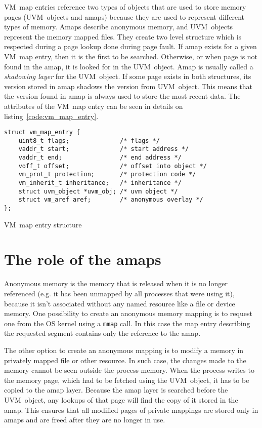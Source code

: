 VM~map entries reference two types of objects that are used to store memory pages (UVM~objects and amaps)
because they are used to represent different types of memory.
Amaps describe anonymous memory, and UVM~objects represent the memory mapped files.
They create two level structure which is respected during a page lookup done during page fault.
If amap exists for a given VM~map entry, then it is the first to be searched.
Otherwise, or when page is not found in the amap, it is looked for in the UVM~object.
Amap is usually called a {\it shadowing layer} for the UVM~object.
If some page exists in both structures, its version stored in amap shadows the version from UVM~object.
This means that the version found in amap is always used to store the most recent data.
The attributes of the VM~map entry can be seen in details on listing~\ref{code:vm_map_entry}.

\begin{listing}
  \begin{verbatim}
struct vm_map_entry {
    uint8_t flags;              /* flags */
    vaddr_t start;              /* start address */
    vaddr_t end;                /* end address */
    voff_t offset;              /* offset into object */
    vm_prot_t protection;       /* protection code */
    vm_inherit_t inheritance;   /* inheritance */
    struct uvm_object *uvm_obj; /* uvm object */
    struct vm_aref aref;        /* anonymous overlay */
};
  \end{verbatim}
  \caption{VM~map entry structure}
  \label{code:vm_map_entry}
\end{listing}

\section{The role of the amaps}

Anonymous memory is the memory that is released when it is no longer referenced (e.g. it has been unmapped by all processes that were using it),
because it isn't associated without any named resource like a file or device memory.
One possibility to create an anonymous memory mapping is to request one from the OS kernel using a \texttt{mmap} call.
In this case the map entry describing the requested segment contains only the reference to the amap.

The other option to create an anonymous mapping is to modify a memory in privately mapped file or other resource.
In such case, the changes made to the memory cannot be seen outside the process memory.
When the process writes to the memory page, which had to be fetched using the UVM~object, it has to be copied to the amap layer.
Because the amap layer is searched before the UVM~object, any lookups of that page will find the copy of it stored in the amap.
This ensures that all modified pages of private mappings are stored only in amaps and are freed after they are no longer in use.

